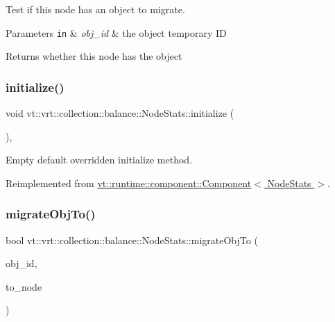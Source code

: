 Test if this node has an object to migrate. 


\begin{DoxyParams}[1]{Parameters}
\mbox{\tt in}  & {\em obj\+\_\+id} & the object temporary ID\\
\hline
\end{DoxyParams}
\begin{DoxyReturn}{Returns}
whether this node has the object 
\end{DoxyReturn}
\mbox{\label{structvt_1_1vrt_1_1collection_1_1balance_1_1_node_stats_a0c60d1566daa6465f56b09e27058d6a1}} 
\subsubsection{\texorpdfstring{initialize()}{initialize()}}
{\footnotesize\ttfamily void vt\+::vrt\+::collection\+::balance\+::\+Node\+Stats\+::initialize (\begin{DoxyParamCaption}{ }\end{DoxyParamCaption})\hspace{0.3cm}{\ttfamily [override]}, {\ttfamily [virtual]}}



Empty default overridden initialize method. 



Reimplemented from \hyperlink{structvt_1_1runtime_1_1component_1_1_component_a7f07384d294e59796add9ce6be2d6410}{vt\+::runtime\+::component\+::\+Component$<$ Node\+Stats $>$}.

\mbox{\label{structvt_1_1vrt_1_1collection_1_1balance_1_1_node_stats_a4beddbda7ae149a3470eba3a2fe80db5}} 
\subsubsection{\texorpdfstring{migrate\+Obj\+To()}{migrateObjTo()}}
{\footnotesize\ttfamily bool vt\+::vrt\+::collection\+::balance\+::\+Node\+Stats\+::migrate\+Obj\+To (\begin{DoxyParamCaption}\item[{\hyperlink{namespacevt_1_1vrt_1_1collection_1_1balance_a14c8d2c972f2913aa3f1636e5be0a120}{Element\+I\+D\+Type}}]{obj\+\_\+id,  }\item[{\hyperlink{namespacevt_a866da9d0efc19c0a1ce79e9e492f47e2}{Node\+Type}}]{to\+\_\+node }\end{DoxyParamCaption})}



